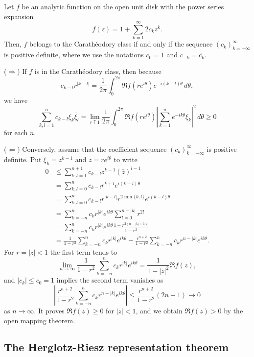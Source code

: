 \documentclass[12pt]{article}
\begin{document}
\begin{thm}
Let $f$ be an analytic function on the open unit disk with the power series expansion
\[f(z)=1+\sum_{k=1}^\infty2c_kz^k.\]
Then, $f$ belongs to the Carath\'eodory class if and only if the sequence $(c_k)_{k=-\infty}^\infty$ is positive definite, where we use the notations $c_0=1$ and $c_{-k}=\bar{c_k}$.
\end{thm}
\begin{pf}
($\Rightarrow$)
If $f$ is in the Carath\'eodory class, then because
\[c_{k-l}r^{|k-l|}=\frac1{2\pi}\int_0^{2\pi}\Re f(re^{i\theta})e^{-i(k-l)\theta}\,d\theta,\]
we have
\[\sum_{k,l=1}^nc_{k-l}\xi_k\bar\xi_l
=\lim_{r\uparrow1}\frac1{2\pi}\int_0^{2\pi}\Re f(re^{i\theta})\left|\sum_{k=1}^ne^{-ik\theta}\xi_k\right|^2\,d\theta\ge0\]
for each $n$.

($\Leftarrow$)
Conversely, assume that the coefficient sequence $(c_k)_{k=-\infty}^\infty$ is positive definite.
Put $\xi_k=z^{k-1}$ and $z=re^{i\theta}$ to write
\begin{align*}
0&\le\sum_{k,l=1}^{n+1}c_{k-l}z^{k-1}(\bar z)^{l-1}\\
&=\sum_{k,l=0}^nc_{k-l}r^{k+l}e^{i(k-l)\theta}\\
&=\sum_{k,l=0}^nc_{k-l}r^{|k-l|}r^{2\min\{k,l\}}e^{i(k-l)\theta}\\
&=\sum_{k=-n}^nc_kr^{|k|}e^{ik\theta}\sum_{l=0}^{n-|k|}r^{2l}\\
&=\sum_{k=-n}^nc_kr^{|k|}e^{ik\theta}\frac{1-r^{2(n-|k|+1)}}{1-r^2}\\
&=\frac1{1-r^2}\sum_{k=-n}^nc_kr^{|k|}e^{ik\theta}
-\frac{r^{n+2}}{1-r^2}\sum_{k=-n}^nc_kr^{n-|k|}e^{ik\theta}.
\end{align*}
For $r=|z|<1$ the first term tends to
\[\lim_{n\to\infty}\frac1{1-r^2}\sum_{k=-n}^nc_kr^{|k|}e^{ik\theta}=\frac1{1-|z|^2}\Re f(z),\]
and $|c_k|\le c_0=1$ implies the second term vanishes as
\[\left|\frac{r^{n+2}}{1-r^2}\sum_{k=-n}^nc_kr^{n-|k|}e^{ik\theta}\right|\le\frac{r^{n+2}}{1-r^2}(2n+1)\to0\]
as $n\to\infty$.
It proves $\Re f(z)\ge0$ for $|z|<1$, and we obtain $\Re f(z)>0$ by the open mapping theorem.
\end{pf}


\subsection{The Herglotz-Riesz representation theorem}
\end{document}
